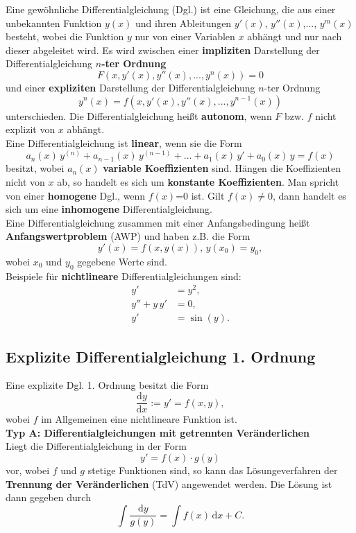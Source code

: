 Eine gew\"ohnliche Differentialgleichung (Dgl.) ist eine Gleichung, die aus einer unbekannten Funktion $y(x)$ und ihren Ableitungen $y'(x)$, $y''(x)$,..., $y^m(x)$ besteht, wobei die Funktion $y$ nur von einer Variablen $x$ abh\"angt und nur nach dieser abgeleitet wird. Es wird zwischen einer \textbf{impliziten} Darstellung der Differentialgleichung \textbf{$n$-ter Ordnung}
$$
F(x, y'(x), y''(x),..., y^n(x)) =0
$$
und einer \textbf{expliziten} Darstellung der Differentialgleichung $n$-ter Ordnung
$$
y^n(x) = f(x, y'(x), y''(x),..., y^{n-1}(x)) 
$$
unterschieden. Die Differentialgleichung hei\ss t \textbf{autonom}, wenn $F$ bzw. $f$ nicht explizit von $x$ abh\"angt. \\

\noindent
Eine Differentialgleichung ist \textbf{linear}, wenn sie die Form
$$
a_n(x)\, y^{(n)} + a_{n-1}(x)\, y^{(n-1)} + \dots + a_1(x)\, y' + a_0(x)\, y = f(x)
$$
besitzt, wobei $a_n(x)$ \textbf{variable Koeffizienten} sind. H\"angen die Koeffizienten nicht von $x$ ab, so handelt es sich um \textbf{konstante Koeffizienten}.
Man spricht von einer \textbf{homogene} Dgl., wenn $f(x)$=0 ist. Gilt $f(x) \neq 0$, dann handelt es sich um eine \textbf{inhomogene} Differentialgleichung.\\

\noindent
Eine Differentialgleichung zusammen mit einer Anfangsbedingung hei\ss t \textbf{Anfangswertproblem} (AWP) und haben z.B. die Form
$$
y'(x)=f(x,y(x)), \,  y(x_0) = y_0,
$$
wobei $x_0$ und $y_0$ gegebene Werte sind.\\

\noindent
Beispiele f\"ur \textbf{nichtlineare} Differentialgleichungen sind:
\begin{align*}
y' &= y^2, \\
y'' +y \, y' &= 0,\\
y' &= \sin(y).
\end{align*}

\subsection*{Explizite Differentialgleichung 1. Ordnung}
Eine explizite Dgl. 1. Ordnung besitzt die Form
$$
\dfrac{\mathrm{d}y}{\mathrm{d}x}:= y' = f(x,y),
$$
wobei $f$ im Allgemeinen eine nichtlineare Funktion ist. \\

\noindent
\textbf{Typ A: Differentialgleichungen mit getrennten Ver\"anderlichen}\\
Liegt die Differentialgleichung in der Form
$$
y' =f(x)\cdot g(y)
$$
vor, wobei $f$ und $g$ stetige Funktionen sind, so kann das L\"osungeverfahren der \textbf{Trennung der Ver\"anderlichen} (TdV) angewendet werden. Die L\"osung ist dann gegeben durch
$$
\int \dfrac{\mathrm{d}y}{g(y)} = \int f(x) \, \mathrm{d}x +C.
$$

